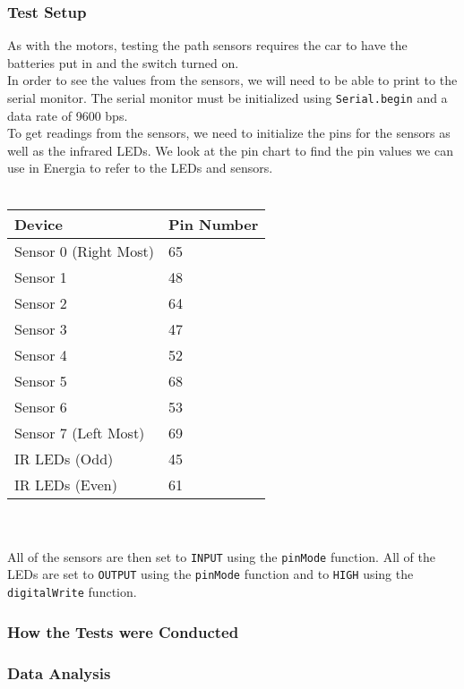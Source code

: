\documentclass[12pt]{article}
\begin{document}
\subsubsection{Test Setup}
As with the motors, testing the path sensors requires the car to have the batteries put in and the switch turned on.
\\ 
In order to see the values from the sensors, we will need to be able to print to the serial monitor. The serial monitor must be initialized using \texttt{Serial.begin} and a data rate of 9600 bps.
\\ 
To get readings from the sensors, we need to initialize the pins for the sensors as well as the infrared LEDs. We look at the pin chart to find the pin values we can use in Energia to refer to the LEDs and sensors.
\\ \\ 
\begin{tabu}{|l|l|}
\hline
\textbf{Device} & \textbf{Pin Number} \\ \hline
Sensor 0 (Right Most) & 65 \\
Sensor 1              & 48 \\
Sensor 2              & 64 \\
Sensor 3              & 47 \\
Sensor 4              & 52 \\
Sensor 5              & 68 \\
Sensor 6              & 53 \\
Sensor 7 (Left Most)  & 69 \\
IR LEDs (Odd)         & 45 \\
IR LEDs (Even)        & 61 \\ \hline
\end{tabu}
\\ \\ 
All of the sensors are then set to \texttt{INPUT} using the \texttt{pinMode} function. All of the LEDs are set to \texttt{OUTPUT} using the \texttt{pinMode} function and to \texttt{HIGH} using the \texttt{digitalWrite} function.

\subsubsection{How the Tests were Conducted}

\subsubsection{Data Analysis}
\end{document}
